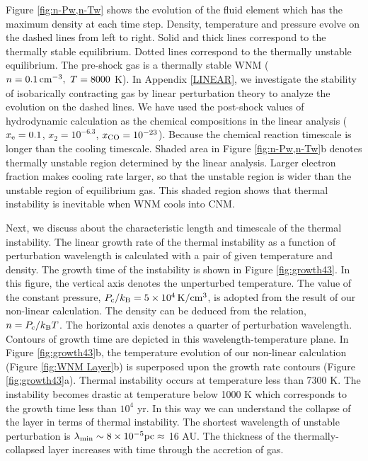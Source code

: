 Figure \ref{fig:n-Pw,n-Tw} shows the evolution of the fluid element 
which has the maximum density at each time step.
Density, temperature and pressure evolve on the dashed lines 
from left to right.
Solid and thick lines correspond to the thermally stable equilibrium. 
Dotted lines correspond to the thermally unstable equilibrium. 
The pre-shock gas is a
thermally stable WNM ($n=0.1 \, {\rm cm^{-3}}, \ T=8000$ K). 
In Appendix \ref{LINEAR}, 
we investigate the stability of isobarically contracting gas
by linear perturbation theory to analyze the evolution on the dashed lines.
We have used the post-shock values of hydrodynamic calculation as the
chemical compositions in the linear analysis
($x_{\rm e}=0.1$, $x_2=10^{-6.3}$, $x_{\rm CO}=10^{-23}$).
Because the chemical reaction timescale is longer than the cooling timescale.
Shaded area in Figure \ref{fig:n-Pw,n-Tw}b denotes 
thermally unstable region determined by the linear analysis.
Larger electron fraction makes cooling rate larger,
so that the unstable region is wider than the unstable region of
equilibrium gas.
This shaded region shows that thermal instability is inevitable
when WNM cools into CNM.

Next, we discuss about the characteristic length and timescale of 
the thermal instability.
The linear growth rate of the thermal instability 
as a function of perturbation wavelength is calculated with 
a pair of given temperature and density.
The growth time of the instability is shown in Figure \ref{fig:growth43}.
In this figure, the vertical axis denotes the unperturbed temperature.
The value of the constant pressure, 
$P_{\rm c}/k_{\rm B}=5 \times 10^4 \,{\rm K/cm^3}$,
is adopted from the result of our non-linear calculation.
The density can be deduced from the relation, $n=P_{\rm c}/k_{\rm B}T$.
The horizontal axis denotes a quarter of perturbation wavelength.
Contours of growth time are depicted in this wavelength-temperature plane.
In Figure \ref{fig:growth43}b,
the temperature evolution of our non-linear calculation 
(Figure \ref{fig:WNM Layer}b) is superposed
upon the growth rate contours (Figure \ref{fig:growth43}a). 
Thermal instability occurs at temperature less than 7300 K.
The instability becomes drastic at temperature below 1000 K 
which corresponds to the growth time less than $10^4$ yr.
In this way we can understand the collapse of the layer in terms of
thermal instability.
The shortest wavelength of unstable perturbation 
is $\lambda_{\rm min} \sim 8\times 10^{-5} {\rm pc}\approx$ 16 AU.  
The thickness of the thermally-collapsed layer increases with time 
through the accretion of gas.

